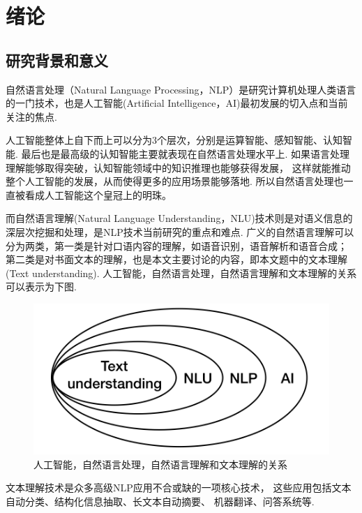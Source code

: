 \documentclass[bachelor,adobefonts]{jnuthesis}
\begin{document}
\tableofcontents

\mainmatter


\chapter{绪论}\label{chapter_introduction}
\section{研究背景和意义}
自然语言处理（Natural Language Processing，NLP）是研究计算机处理人类语言的一门技术，也是人工智能(Artificial Intelligence，AI)最初发展的切入点和当前关注的焦点.

人工智能整体上自下而上可以分为3个层次，分别是运算智能、感知智能、认知智能.
最后也是最高级的认知智能主要就表现在自然语言处理水平上.
如果语言处理理解能够取得突破，认知智能领域中的知识推理也能够获得发展，
这样就能推动整个人工智能的发展，从而使得更多的应用场景能够落地.
所以自然语言处理也一直被看成人工智能这个皇冠上的明珠。

而自然语言理解(Natural Language Understanding，NLU)技术则是对语义信息的深层次挖掘和处理，是NLP技术当前研究的重点和难点.
广义的自然语言理解可以分为两类，第一类是针对口语内容的理解，如语音识别，语音解析和语音合成；
第二类是对书面文本的理解，也是本文主要讨论的内容，即本文题中的文本理解(Text understanding).
人工智能，自然语言处理，自然语言理解和文本理解的关系可以表示为下图.

\begin{figure}[h!]
  \centering
  \includegraphics[width=0.5\linewidth]{结构关系.png}
  \caption{人工智能，自然语言处理，自然语言理解和文本理解的关系}
\end{figure}

文本理解技术是众多高级NLP应用不合或缺的一项核心技术，
这些应用包括文本自动分类、结构化信息抽取、长文本自动摘要、
机器翻译、问答系统等.
\end{document}
